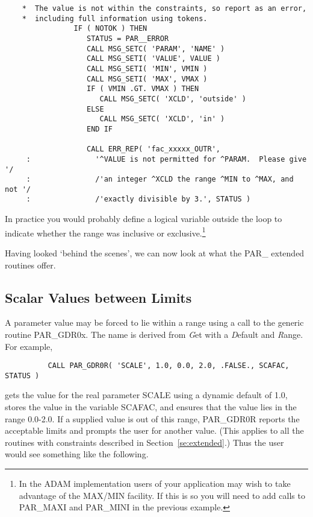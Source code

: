 \documentclass[twoside,11pt]{article}
\newcommand{\xlabel}[1]{}
\newcommand{\dash}{--}
\renewcommand{\dash}{-}
\begin{document}
\begin{verbatim}
    *  The value is not within the constraints, so report as an error,
    *  including full information using tokens. 
                IF ( NOTOK ) THEN
                   STATUS = PAR__ERROR
                   CALL MSG_SETC( 'PARAM', 'NAME' )
                   CALL MSG_SETI( 'VALUE', VALUE )
                   CALL MSG_SETI( 'MIN', VMIN )
                   CALL MSG_SETI( 'MAX', VMAX )
                   IF ( VMIN .GT. VMAX ) THEN
                      CALL MSG_SETC( 'XCLD', 'outside' )
                   ELSE
                      CALL MSG_SETC( 'XCLD', 'in' )
                   END IF

                   CALL ERR_REP( 'fac_xxxxx_OUTR',
     :               '^VALUE is not permitted for ^PARAM.  Please give '/
     :               /'an integer ^XCLD the range ^MIN to ^MAX, and not '/
     :               /'exactly divisible by 3.', STATUS )
\end{verbatim}

In practice you would probably define a logical variable outside the loop
to indicate whether the range was inclusive or exclusive.\footnote{In
the ADAM implementation users of your application may wish to take 
advantage of the MAX/MIN facility.  If this is so you will need to add
calls to PAR\_MAXI and PAR\_MINI in the previous example.}

Having looked `behind the scenes', we can now look at what the PAR\_ extended
routines offer.

\subsection{\xlabel{scalar_values_between_limits}Scalar Values between Limits}
\label{se:range}

A parameter value may be forced to lie within a range using a call to
the generic routine PAR\_GDR0x.  The name is derived from {\em G\/}et
with a {\em D\/}efault and {\em R\/}ange.  For example, 

\begin{verbatim}
          CALL PAR_GDR0R( 'SCALE', 1.0, 0.0, 2.0, .FALSE., SCAFAC, STATUS )
\end{verbatim}

gets the value for the real parameter SCALE using a dynamic default of
1.0, stores the value in the variable SCAFAC, and ensures that the value
lies in the range 0.0\dash2.0.  If a supplied value is out of this range,
PAR\_GDR0R reports the acceptable limits and prompts the user for
another value. (This applies to all the routines with constraints
described in Section~\ref{se:extended}.)  Thus the user would see
something like the following. 
\end{document}
